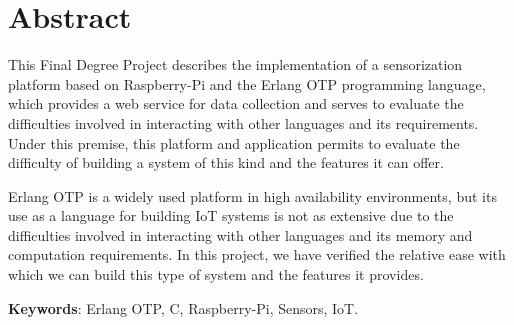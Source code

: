 \documentclass[openright,twoside,12pt]{book}
\begin{document}
\chapter*{Abstract}
\begin{center}
    \begin{minipage}[h]{0.8\textwidth}


This Final Degree Project describes the implementation of a sensorization platform based on Raspberry-Pi and the Erlang OTP programming language, which provides a web service for data collection and serves to evaluate the difficulties involved in interacting with other languages and its requirements. Under this premise, this platform and application permits to evaluate the difficulty of building a system of this kind and the features it can offer.

Erlang OTP is a widely used platform in high availability environments, but its use as a language for building IoT systems is not as extensive due to the difficulties involved in interacting with other languages and its memory and computation requirements. In this project, we have verified the relative ease with which we can build this type of system and the features it provides.

\parskip 1cm

\textbf{Keywords}: Erlang OTP, C, Raspberry-Pi, Sensors, IoT.
\end{minipage}
\end{center}


\tableofcontents

\listoffigures %

\cleardoublepage

\listoftables %

\cleardoublepage
{} %

\lstlistoflistings

\mainmatter


\nocite{*}



















\newpage


 
\end{document}
